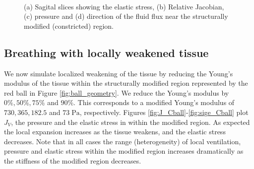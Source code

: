 %
%
\label{sec:constriction}
\begin{figure}[h]
  \centering
    \\
\caption{(a) Sagital slices showing the elastic stress, (b) Relative Jacobian, (c) pressure and (d) direction of the fluid flux near the structurally modified (constricted) region.}
  \label{fig:constriction_slices}
\end{figure}
%
%
\subsection{Breathing with locally weakened tissue}
\label{sec:weakening}
%
We now simulate localized weakening of the tissue by reducing the Young's modulus of the tissue within the structurally modified region represented by the red ball in Figure \ref{fig:ball_geometry}. We reduce the Young's modulus by $0\%,50\%,75\%$ and $90\%$. This corresponds to a modified Young's modulus of $730,365,182.5$ and $73\;\mbox{Pa}$, respectively.
%
Figures \ref{fig:J_Cball}-\ref{fig:sige_Cball} plot $J_V$, the pressure and the elastic stress in within the modified region. As expected the local expansion increases as the tissue weakens, and the elastic stress decreases. Note that in all cases the range (heterogeneity) of local ventilation,  pressure and elastic stress within the modified region increases dramatically as the stiffness of the modified region decreases.
%

